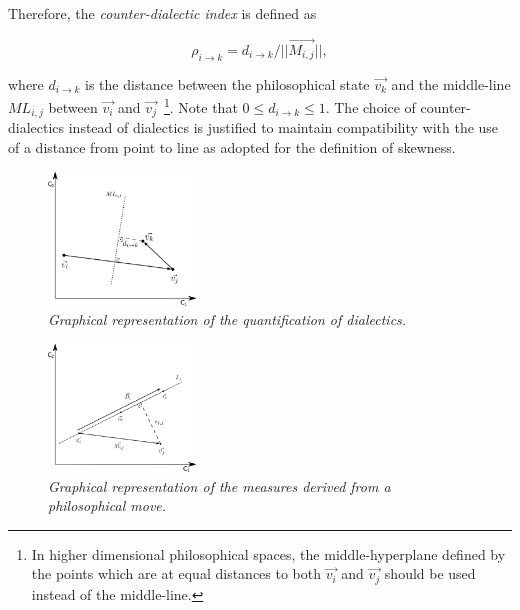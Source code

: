 \documentclass[%
 aip,
 jmp,%
 amsmath,amssymb,
 reprint,%
]{revtex4-1}
\begin{document}
Therefore, the \emph{counter-dialectic index} is defined as 

\begin{equation}
\rho_{i \rightarrow k} = d_{i \rightarrow k}/ || \vec{M_{i,j}}||, 
\end{equation}

where $d_{i \rightarrow k}$ is the distance between the philosophical
state $\vec{v_k}$ and the middle-line $ML_{i,j}$ between $\vec{v_i}$
and $\vec{v_j}$~\footnote{In higher dimensional philosophical spaces,
the middle-hyperplane defined by the points which are at equal
distances to both $\vec{v_i}$ and $\vec{v_j}$ should be used instead
of the middle-line.}.  Note that $0 \leq d_{i \rightarrow k} \leq
1$.  The choice of counter-dialectics instead of dialectics is justified
to maintain compatibility with the use of a distance from point
to line as adopted for the definition of skewness.
\begin{figure}
        \begin{center}
                \includegraphics[width=0.35\textwidth]{dialetica_.eps}
        \end{center}
        \caption{\it Graphical representation of the quantification of dialectics.}
        \label{fig.1}
\end{figure}


\begin{figure}
        \begin{center}
                \includegraphics[width=0.35\textwidth]{phil-space-desc_}
        \end{center}
        \caption{\it Graphical representation of the measures derived from a \emph{philosophical move}.}
        \label{fig.1}
\end{figure}
\end{document}
